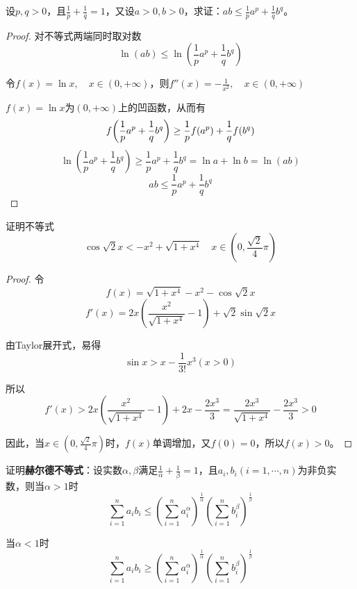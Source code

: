 \begin{problem}
	设$p,q>0$，且$\frac{1}{p}+\frac{1}{q}=1$，又设$a>0,b>0$，求证：$ab\leq \frac{1}{p}a^p+\frac{1}{q}b^q$。
	\begin{proof}
		对不等式两端同时取对数
        \[\ln{(ab)}\leq \ln{(\frac{1}{p}a^p+\frac{1}{q}b^q)}\]

        令$f(x)=\ln{x},\quad x\in (0,+\infty)$，则$f''(x)=-\frac{1}{x^2},\quad x\in (0,+\infty)$

        $f(x)=\ln{x}$为$(0,+\infty)$上的凹函数，从而有
        \[f\qty(\frac{1}{p}a^p+\frac{1}{q}b^q)\geq \frac{1}{p}f(a^p)+\frac{1}{q}f(b^q)\]
        \[\ln{(\frac{1}{p}a^p+\frac{1}{q}b^q)}\geq \frac{1}{p}a^p+\frac{1}{q}b^q=\ln{a}+\ln{b}=\ln{(ab)}\]
        \[ab\leq \frac{1}{p}a^p+\frac{1}{q}b^q\]
	\end{proof}
\end{problem}

\begin{problem}
	证明不等式
    \[\cos{\sqrt{2}x}<-x^2+\sqrt{1+x^4}\quad x\in (0,\frac{\sqrt{2}}{4}\pi)\]
	\begin{proof}
		令
        \[f(x)=\sqrt{1+x^4}-x^2-\cos{\sqrt{2}x}\]
        \[f'(x)=2x(\frac{x^2}{\sqrt{1+x^4}}-1)+\sqrt{2}\sin{\sqrt{2}x}\]

        由Taylor展开式，易得
        \[\sin{x}>x-\frac{1}{3!}x^3(x>0)\]

        所以
        \[f'(x)>2x(\frac{x^2}{\sqrt{1+x^4}}-1)+2x-\frac{2x^3}{3}=\frac{2x^3}{\sqrt{1+x^4}}-\frac{2x^3}{3}>0\]

        因此，当$x\in (0,\frac{\sqrt{2}}{4}\pi)$时，$f(x)$单调增加，又$f(0)=0$，所以$f(x)>0$。
	\end{proof}
\end{problem}
\newpage
\begin{problem}[思考题]
	证明\textbf{赫尔德不等式}：设实数$\alpha,\beta$满足$\frac{1}{\alpha}+\frac{1}{\beta}=1$，且$a_i,b_i(i=1,\cdots,n)$为非负实数，则当$\alpha>1$时
    \[\sum^n_{i=1}a_i b_i\leq (\sum^n_{i=1}a^\alpha_i)^{\frac{1}{\alpha}}(\sum^n_{i=1}b^\beta_i)^{\frac{1}{\beta}}\]

    当$\alpha<1$时
    \[\sum^n_{i=1}a_i b_i\geq (\sum^n_{i=1}a^\alpha_i)^{\frac{1}{\alpha}}(\sum^n_{i=1}b^\beta_i)^{\frac{1}{\beta}}\]
\end{problem}

